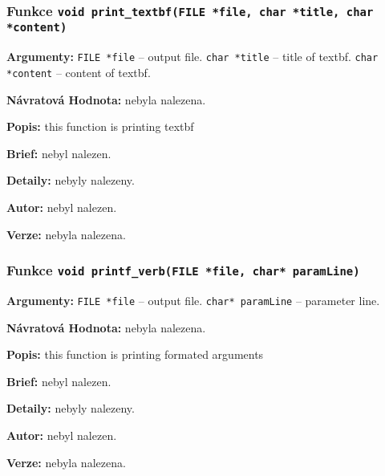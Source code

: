 \documentclass[12pt, a4paper]{article}
\begin{document}
\subsubsection{Funkce \texttt{void print\_textbf(FILE *file, char *title, char *content)}}
\textbf{Argumenty: }\verb"FILE *file" -- output file. \verb"char *title" -- title of textbf. \verb"char *content" -- content of textbf. \\
\par\noindent
\textbf{Návratová Hodnota: }nebyla nalezena.\\
\par\noindent
\textbf{Popis: }this function is printing textbf\\
\par\noindent
\textbf{Brief: }nebyl nalezen.\\
\par\noindent
\textbf{Detaily: }nebyly nalezeny.\\
\par\noindent
\textbf{Autor: }nebyl nalezen.\\
\par\noindent
\textbf{Verze: }nebyla nalezena.\\
\par\noindent
\subsubsection{Funkce \texttt{void printf\_verb(FILE *file, char* paramLine)}}
\textbf{Argumenty: }\verb"FILE *file" -- output file. \verb"char* paramLine" -- parameter line. \\
\par\noindent
\textbf{Návratová Hodnota: }nebyla nalezena.\\
\par\noindent
\textbf{Popis: }this function is printing formated arguments\\
\par\noindent
\textbf{Brief: }nebyl nalezen.\\
\par\noindent
\textbf{Detaily: }nebyly nalezeny.\\
\par\noindent
\textbf{Autor: }nebyl nalezen.\\
\par\noindent
\textbf{Verze: }nebyla nalezena.\\
\par\noindent
\end{document}
